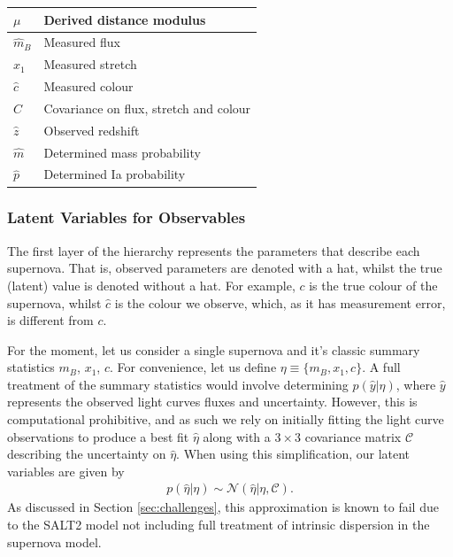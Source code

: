 \documentclass[a4paper,fleqn,usenatbib]{mnras}
\newcommand{\green}{\color{forestgreen}}
\begin{document}
\begin{table}
\begin{tabular}{ll}
		$\mu$ & Derived distance modulus \\
		\hline
		$\hat{m}_B$ & Measured flux\\
		$\hat{x}_1$ & Measured stretch \\
		$\hat{c}$ & Measured colour \\
		$C$ & Covariance on flux, stretch and colour \\
		$\hat{z}$ & Observed redshift \\
		$\hat{m}$ & Determined mass probability \\
		$\hat{p}$ & Determined Ia probability \\
		\hline
	\end{tabular}
\end{table}


\subsubsection{Latent Variables for Observables}

The first layer of the hierarchy represents the parameters that describe each supernova. That is, observed parameters are denoted with a hat, whilst the true (latent) value is denoted without a hat. For example, $c$ is the true colour of the supernova, whilst $\hat{c}$ is the colour we observe, which, as it has measurement error, is different from $c$.

For the moment, let us consider a single supernova and it's classic summary statistics $m_B$, $x_1$, $c$. For convenience, let us define $\eta \equiv \lbrace m_B, x_1, c \rbrace$. A full treatment of the summary statistics would involve determining $p(\hat{y}|\eta)$, where $\hat{y}$ represents the observed light curves {\green fluxes} and uncertainty. However, this is computational prohibitive, and as such we rely on initially fitting the light curve observations to produce a best fit $\hat{\eta}$ along with a $3\times3$ covariance matrix $\mathcal{C}$ describing the uncertainty on $\hat{\eta}$. When using this simplification, our latent variables are given by
\begin{align}
p(\hat{\eta}|\eta) \sim \mathcal{N}(\hat{\eta} | \eta, \mathcal{C}). \label{eq:pop}
\end{align}
As discussed in Section \ref{sec:challenges}, this approximation is known to fail due to the SALT2 model not including {\green full treatment of} intrinsic dispersion in the supernova model.
\end{document}
